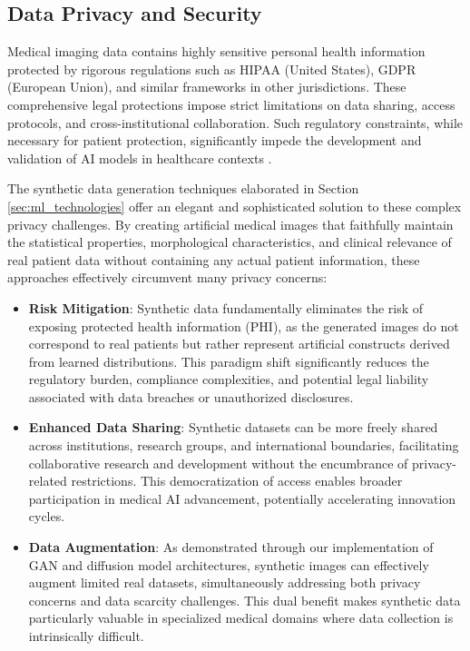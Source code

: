 \documentclass{article}
\begin{document}
\subsection{Data Privacy and Security}
Medical imaging data contains highly sensitive personal health information protected by rigorous regulations such as HIPAA (United States), GDPR (European Union), and similar frameworks in other jurisdictions. These comprehensive legal protections impose strict limitations on data sharing, access protocols, and cross-institutional collaboration. Such regulatory constraints, while necessary for patient protection, significantly impede the development and validation of AI models in healthcare contexts \cite{koetzierGeneratingSyntheticData2024}.

The synthetic data generation techniques elaborated in Section \ref{sec:ml_technologies} offer an elegant and sophisticated solution to these complex privacy challenges. By creating artificial medical images that faithfully maintain the statistical properties, morphological characteristics, and clinical relevance of real patient data without containing any actual patient information, these approaches effectively circumvent many privacy concerns:

\begin{itemize}
    \item \textbf{Risk Mitigation}: Synthetic data fundamentally eliminates the risk of exposing protected health information (PHI), as the generated images do not correspond to real patients but rather represent artificial constructs derived from learned distributions. This paradigm shift significantly reduces the regulatory burden, compliance complexities, and potential legal liability associated with data breaches or unauthorized disclosures.
    
    \item \textbf{Enhanced Data Sharing}: Synthetic datasets can be more freely shared across institutions, research groups, and international boundaries, facilitating collaborative research and development without the encumbrance of privacy-related restrictions. This democratization of access enables broader participation in medical AI advancement, potentially accelerating innovation cycles.
    
    \item \textbf{Data Augmentation}: As demonstrated through our implementation of GAN and diffusion model architectures, synthetic images can effectively augment limited real datasets, simultaneously addressing both privacy concerns and data scarcity challenges. This dual benefit makes synthetic data particularly valuable in specialized medical domains where data collection is intrinsically difficult.
\end{itemize}
\end{document}
